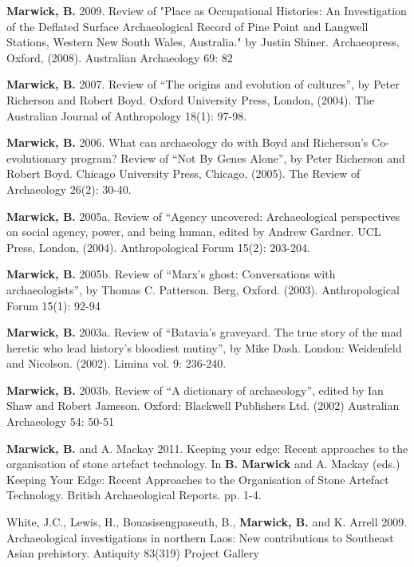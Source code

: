 \documentclass[11pt,article,oneside]{memoir}
\begin{document}
\ind \textbf{Marwick, B.} 2009. Review of "Place as Occupational Histories: An Investigation of the Deflated Surface Archaeological Record of Pine Point and Langwell Stations, Western New South Wales, Australia." by Justin Shiner. Archaeopress, Oxford, (2008). Australian Archaeology 69: 82

\ind \textbf{Marwick, B.} 2007. Review of “The origins and evolution of cultures”, by Peter Richerson and Robert Boyd. Oxford University Press, London, (2004). The Australian Journal of Anthropology 18(1): 97-98.

\ind \textbf{Marwick, B.} 2006. What can archaeology do with Boyd and Richerson’s Co-evolutionary program? Review of “Not By Genes Alone”, by Peter Richerson and Robert Boyd. Chicago University Press, Chicago, (2005). The Review of Archaeology 26(2): 30-40.

\ind \textbf{Marwick, B.} 2005a. Review of “Agency uncovered: Archaeological perspectives on social agency, power, and being human, edited by Andrew Gardner. UCL Press, London, (2004). Anthropological Forum 15(2): 203-204.

\ind \textbf{Marwick, B.} 2005b. Review of “Marx’s ghost: Conversations with archaeologists”, by Thomas C. Patterson. Berg, Oxford. (2003). Anthropological Forum 15(1): 92-94

\ind \textbf{Marwick, B.} 2003a. Review of “Batavia’s graveyard. The true story of the mad heretic who lead history’s bloodiest mutiny”, by Mike Dash. London: Weidenfeld and Nicolson. (2002). Limina vol. 9: 236-240.

\ind \textbf{Marwick, B.} 2003b. Review of “A dictionary of archaeology”, edited by Ian Shaw and Robert Jameson. Oxford: Blackwell Publishers Ltd. (2002) Australian Archaeology 54: 50-51

\bigskip


\ind \textbf{Marwick, B.} and A. Mackay 2011. Keeping your edge: Recent approaches to the organisation of stone artefact technology. In \textbf{B. Marwick} and A. Mackay (eds.) Keeping Your Edge: Recent Approaches to the Organisation of Stone Artefact Technology. British Archaeological Reports.  pp. 1-4.

\ind White, J.C., Lewis, H., Bouasisengpaseuth, B., \textbf{Marwick, B.} and K. Arrell 2009. Archaeological investigations in northern Laos: New contributions to Southeast Asian prehistory. Antiquity 83(319) Project Gallery
\end{document}
